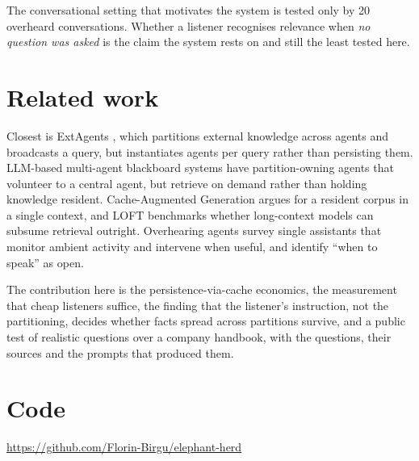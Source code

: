 \documentclass[11pt]{article}
\begin{document}
The conversational setting that motivates the system is tested only by 20 overheard
conversations. Whether a listener recognises relevance when \emph{no question was asked}
is the claim the system rests on and still the least tested here.

\section{Related work}

Closest is ExtAgents \cite{extagents}, which partitions external knowledge across agents
and broadcasts a query, but instantiates agents per query rather than persisting them.
LLM-based multi-agent blackboard systems \cite{blackboard} have partition-owning agents
that volunteer to a central agent, but retrieve on demand rather than holding knowledge
resident.
Cache-Augmented Generation \cite{cag} argues for a resident corpus in a single context,
and LOFT \cite{loft} benchmarks whether long-context models can subsume retrieval
outright.
Overhearing agents \cite{overhearing} survey single assistants that monitor ambient
activity and intervene when useful, and identify ``when to speak'' as open.

The contribution here is the persistence-via-cache economics, the measurement that
cheap listeners suffice, the finding that the listener's instruction, not the
partitioning, decides whether facts spread across partitions survive, and a public test
of realistic questions over a company handbook, with the questions, their sources and
the prompts that produced them.

\section*{Code}

\url{https://github.com/Florin-Birgu/elephant-herd}
\end{document}
